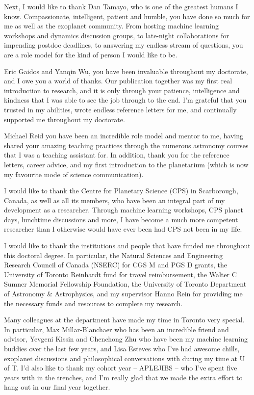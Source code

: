 \documentclass[letterpaper]{ut-thesis} %
\begin{document}
\begin{preliminary}
\begin{acknowledgements}
Next, I would like to thank Dan Tamayo, who is one of the greatest humans I know. 
Compassionate, intelligent, patient and humble, you have done so much for me as well as the exoplanet community. 
From hosting machine learning workshops and dynamics discussion groups, to late-night collaborations for impending postdoc deadlines, to answering my endless stream of questions, you are a role model for the kind of person I would like to be. 

Eric Gaidos and Yanqin Wu, you have been invaluable throughout my doctorate, and I owe you a world of thanks. 
Our publication together was my first real introduction to research, and it is only through your patience, intelligence and kindness that I was able to see the job through to the end. 
I'm grateful that you trusted in my abilities, wrote endless reference letters for me, and continually supported me throughout my doctorate.

Michael Reid you have been an incredible role model and mentor to me, having shared your amazing teaching practices through the numerous astronomy courses that I was a teaching assistant for. 
In addition, thank you for the reference letters, career advice, and my first introduction to the planetarium (which is now my favourite mode of science communication).

I would like to thank the Centre for Planetary Science (CPS) in Scarborough, Canada, as well as all its members, who have been an integral part of my development as a researcher. 
Through machine learning workshops, CPS planet days, lunchtime discussions and more, I have become a much more competent researcher than I otherwise would have ever been had CPS not been in my life. 

I would like to thank the institutions and people that have funded me throughout this doctoral degree. 
In particular, the Natural Sciences and Engineering Research Council of Canada (NSERC) for CGS M and PGS D grants, the University of Toronto Reinhardt fund for travel reimbursement, the Walter C Sumner Memorial Fellowship Foundation, the University of Toronto Department of Astronomy \& Astrophysics, and my supervisor Hanno Rein for providing me the necessary funds and resources to complete my research. 

Many colleagues at the department have made my time in Toronto very special. 
In particular, Max Millar-Blanchaer who has been an incredible friend and advisor, Yevgeni Kissin and Chenchong Zhu who have been my machine learning buddies over the last few years, and Lisa Esteves who I've had awesome chills, exoplanet discussions and philosophical conversations with during my time at U of T.
I'd also like to thank my cohort year -- APLEJIBS -- who I've spent five years with in the trenches, and I'm really glad that we made the extra effort to hang out in our final year together. 


\end{acknowledgements}
\end{preliminary}
\end{document}
